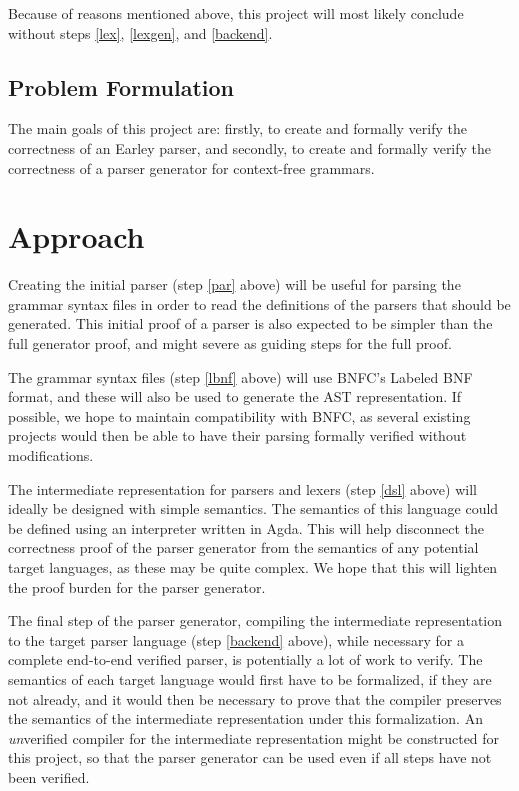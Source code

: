 \documentclass{article}
\begin{document}
		Because of reasons mentioned above, this project will most likely
		conclude without steps \ref{lex}, \ref{lexgen}, and \ref{backend}.

	\subsection{Problem Formulation}

		The main goals of this project are: firstly, to create and formally
		verify the correctness of an Earley parser, and secondly, to create and
		formally verify the correctness of a parser generator for context-free
		grammars.


\section{Approach}

	Creating the initial parser (step \ref{par} above) will be useful for
	parsing the grammar syntax files in order to read the definitions of the
	parsers that should be generated. This initial proof of a parser is also
	expected to be simpler than the full generator proof, and might severe as
	guiding steps for the full proof.

	The grammar syntax files (step \ref{lbnf} above) will use BNFC's
	Labeled BNF format, and these will also be used to generate the AST
	representation. If possible, we hope to maintain compatibility with BNFC,
	as several existing projects would then be able to have their parsing
	formally verified without modifications.

	The intermediate representation for parsers and lexers (step \ref{dsl}
	above) will ideally be designed with simple semantics. The semantics of
	this language could be defined using an interpreter written in Agda. This
	will help disconnect the correctness proof of the parser generator from the
	semantics of any potential target languages, as these may be quite complex.
	We hope that this will lighten the proof burden for the parser generator.


	The final step of the parser generator, compiling the intermediate
	representation to the target parser language (step \ref{backend} above),
	while necessary for a complete end-to-end verified parser, is potentially a
	lot of work to verify. The semantics of each target language would first
	have to be formalized, if they are not already, and it would then be
	necessary to prove that the compiler preserves the semantics of the
	intermediate representation under this formalization. An \emph{un}verified
	compiler for the intermediate representation might be constructed for this
	project, so that the parser generator can be used even if all steps have
	not been verified.
\end{document}
